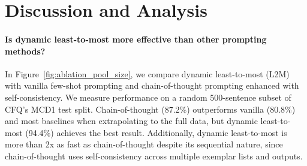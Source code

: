 \documentclass{article} \usepackage{iclr2022_conference,times}
\begin{document}
\begin{figure}[t!]
\begin{floatrow}
\end{floatrow}
\end{figure}


\section{Discussion and Analysis}

\paragraph{Is dynamic least-to-most more effective than other prompting methods?} 

In Figure~\ref{fig:ablation_pool_size}, we compare dynamic least-to-most (L2M) with vanilla few-shot prompting and chain-of-thought prompting enhanced with self-consistency. We measure performance on a random 500-sentence subset of CFQ's MCD1 test split. Chain-of-thought (87.2\%) outperforms vanilla (80.8\%) and most baselines when extrapolating to the full data, but dynamic least-to-most (94.4\%) achieves the best result. Additionally, dynamic least-to-most is more than 2x as fast as chain-of-thought despite its sequential nature, since chain-of-thought uses self-consistency across multiple exemplar lists and outputs.
\end{document}
